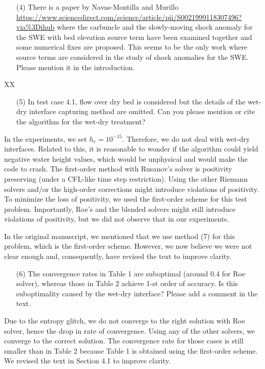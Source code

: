 \documentclass[english,11pt]{article}
\begin{document}
\bigskip
{\color{OliveGreen}
  \begin{itemize}
  \item[(4)]
    There is a paper by Navas-Montilla and Murillo 
    \url{https://www.sciencedirect.com/science/article/pii/S0021999118307496?via\%3Dihub}
    where the carbuncle and the slowly-moving shock anomaly for the SWE with bed elevation source term 
    have been examined together and some numerical fixes are proposed. This seems to be the only work 
    where source terms are considered in the study of shock anomalies for the SWE. 
    Please mention it in the introduction.
  \end{itemize}
}
\noindent
XX

\bigskip
{\color{OliveGreen}
  \begin{itemize}
  \item[(5)]
    In test case 4.1, flow over dry bed is considered but the details of the wet-dry interface 
    capturing method are omitted. Can you please mention or cite the algorithm for the wet-dry treatment?
  \end{itemize}
}
\noindent
In the experiments, we set $h_r=10^{-15}$. Therefore, we do not deal with wet-dry interfaces. 
Related to this, it is reasonable to wonder if the algorithm could yield negative water height values, 
which would be unphysical and would make the code to crash. 
The first-order method with Rusanov's solver is positivity preserving (under a CFL-like time step restriction). 
Using the other Riemann solvers and/or the high-order corrections might introduce violations of positivity.
To minimize the loss of positivity, we used the first-order scheme for this test problem. 
Importantly, Roe's and the blended solvers might still introduce violations of positivity, but 
we did not observe that in our experiments. 

In the original manuscript, we mentioned that we use method (7) for this problem, 
which is the first-order scheme. However, we now believe we were not clear enough and, 
consequently, have revised the text to improve clarity. 

\bigskip
{\color{OliveGreen}
  \begin{itemize}
  \item[(6)]
    The convergence rates in Table 1 are suboptimal (around 0.4 for Roe solver), 
    whereas those in Table 2 achieve 1-st order of accuracy. Is this suboptimality caused by 
    the wet-dry interface? Please add a comment in the text.
  \end{itemize}
}
\noindent
Due to the entropy glitch, we do not converge to the right solution with Roe solver,
hence the drop in rate of convergence.
Using any of the other solvers, we converge to the correct solution. The convergence rate
for those cases is still smaller than in Table 2 because Table 1 is obtained using the first-order scheme. 
We revised the text in Section 4.1 to improve clarity. 
\end{document}
